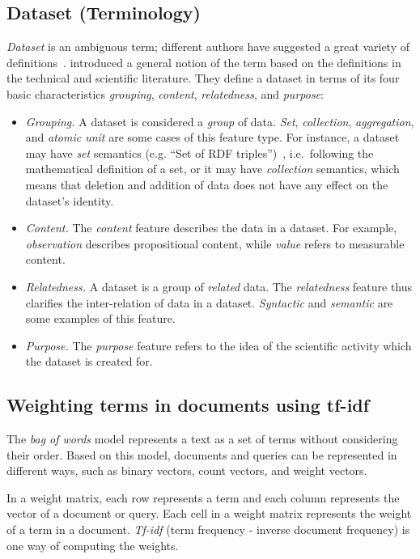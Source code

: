 \documentclass{IOS-Book-Article}
\begin{document}
\subsection{Dataset (Terminology)} 
\emph{Dataset} is an ambiguous term; different authors have suggested a great variety of definitions~\cite{peplerpreservation}.
\citeauthor{renear2010definitions} introduced a general notion of the term based on the definitions in the technical and scientific literature.
They define a dataset in terms of its four basic characteristics \emph{grouping}, \emph{content}, \emph{relatedness}, and \emph{purpose}:
\begin{itemize}
	\item \emph{Grouping.} A dataset is considered a \emph{group} of data.
		\emph{Set}, \emph{collection}, \emph{aggregation}, and \emph{atomic unit} are some cases of this feature type.
		For instance, a dataset may have \emph{set} semantics (e.g. “Set of RDF triples”)~\cite{renear2010definitions}, i.e.\ following the mathematical definition of a set, or it may have \emph{collection} semantics, which means that deletion and addition of data does not have any effect on the dataset's identity.
	\item \emph{Content.} The \emph{content} feature describes the data in a dataset.
		For example, \emph{observation} describes propositional content, while \emph{value} refers to measurable content.
	\item \emph{Relatedness.} A dataset is a group of \emph{related} data.
		The \emph{relatedness} feature thus clarifies the inter-relation of data in a dataset.
		\emph{Syntactic} and \emph{semantic} are some examples of this feature.   
	\item \emph{Purpose.} The \emph{purpose} feature refers to the idea of the scientific activity which the dataset is created for.
\end{itemize}

\subsection{Weighting terms in documents using tf-idf}
\label{sec:tfidf}
The \emph{bag of words} model represents a text as a set of terms without considering their order.
Based on this model, documents and queries can be represented in different ways, such as binary vectors, count vectors, and weight vectors. 

In a weight matrix, each row represents a term and each column represents the vector of a document or query. 
Each cell in a weight matrix represents the weight of a term in a document. 
\emph{Tf-idf} (term frequency - inverse document frequency) is one way of computing the weights.
\end{document}
